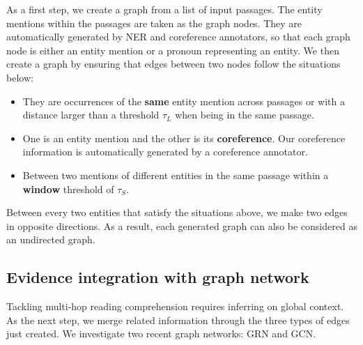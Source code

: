 \documentclass[letterpaper]{article}
\begin{document}
As a first step, we create a graph from a list of input passages.
The entity mentions within the passages are taken as the graph nodes. 
They are automatically generated by NER and coreference annotators, so that each graph node is either an entity mention or a pronoun representing an entity.
We then create a graph by ensuring that edges between two nodes follow the situations below:
\begin{itemize}
\item They are occurrences of the \textbf{same} entity mention across passages or with a distance larger than a threshold $\tau_L$ when being in the same passage.
\item One is an entity mention and the other is its \textbf{coreference}. Our coreference information is automatically generated by a coreference annotator.
\item Between two mentions of different entities in the same passage within a \textbf{window} threshold of $\tau_S$.
\end{itemize}
Between every two entities that satisfy the situations above, we make two edges in opposite directions. 
As a result, each generated graph can also be considered as an undirected graph.





\subsection{Evidence integration with graph network}




Tackling multi-hop reading comprehension requires inferring on global context.
As the next step, we merge related information through the three types of edges just created. 
We investigate two recent graph networks: GRN and GCN.
\end{document}
